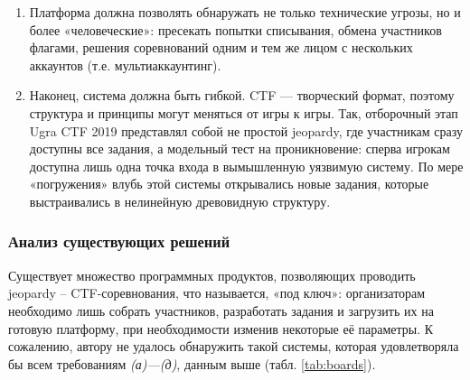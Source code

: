 \begin{enumerate}
\item
Платформа должна позволять обнаружать не только технические угрозы, но и более «человеческие»: пресекать попытки списывания, обмена участников флагами, решения соревнований одним и тем же лицом с нескольких аккаунтов (т.е. мультиаккаунтинг).

\item
Наконец, система должна быть гибкой. CTF --- творческий формат, поэтому структура и принципы могут меняться от игры к игры. Так, отборочный этап Ugra CTF 2019 представлял собой не простой jeopardy, где участникам сразу доступны все задания, а модельный тест на проникновение: сперва игрокам доступна лишь одна точка входа в вымышленную уязвимую систему. По мере «погружения» влубь этой системы открывались новые задания, которые выстраивались в нелинейную древовидную структуру\cite{UgraCTF19Q}.
\end{enumerate}


\subsubsection{Анализ существующих решений}

Существует множество программных продуктов, позволяющих проводить jeopardy -- CTF-соревнования, что называется, «под ключ»: организаторам необходимо лишь собрать участников, разработать задания и загрузить их на готовую платформу, при необходимости изменив некоторые её параметры. К сожалению, автору не удалось обнаружить такой системы, которая удовлетворяла бы всем требованиям \textit{(а)---(д)}, данным выше (табл. \ref{tab:boards}).

